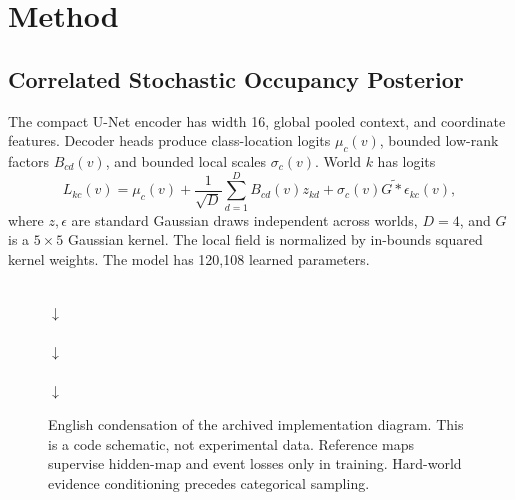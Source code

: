 \documentclass[conference,letterpaper,10pt]{IEEEtran}
\begin{document}
\section{Method}
\subsection{Correlated Stochastic Occupancy Posterior}
The compact U-Net encoder has width 16, global pooled context, and coordinate features. Decoder heads produce class-location logits $\mu_c(v)$, bounded low-rank factors $B_{cd}(v)$, and bounded local scales $\sigma_c(v)$. World $k$ has logits
\begin{equation}
 L_{kc}(v)=\mu_c(v)+\frac{1}{\sqrt D}\sum_{d=1}^{D}B_{cd}(v)z_{kd}
 +\sigma_c(v)\widetilde{G*\epsilon}_{kc}(v),
\end{equation}
where $z,\epsilon$ are standard Gaussian draws independent across worlds, $D=4$, and $G$ is a $5\times5$ Gaussian kernel. The local field is normalized by in-bounds squared kernel weights. The model has 120,108 learned parameters.

\begin{figure}[t]
\centering\small
\setlength{\fboxsep}{5pt}
\\[-1pt]$\downarrow$\\[-1pt]
\\[-1pt]$\downarrow$\\[-1pt]
\\[-1pt]$\downarrow$\\[-1pt]
\caption{English condensation of the archived implementation diagram. This is a code schematic, not experimental data. Reference maps supervise hidden-map and event losses only in training. Hard-world evidence conditioning precedes categorical sampling.}
\label{fig:architecture}
\end{figure}
\end{document}
